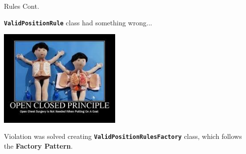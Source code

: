 \documentclass{beamer}
\begin{document}
  \begin{frame} {Rules Cont.}

    \textbf{\texttt{ValidPositionRule}} class had something wrong...

    \vspace{1em}


    \pause
    \hfill
    \includegraphics[width=0.45\textwidth]{img/openclosedprinciple.jpeg}

    \pause

    \vspace{1em}

    Violation was solved creating \textbf{\texttt{ValidPositionRulesFactory}} class, which follows the \textbf{Factory Pattern}.

  \end{frame}
\end{document}
